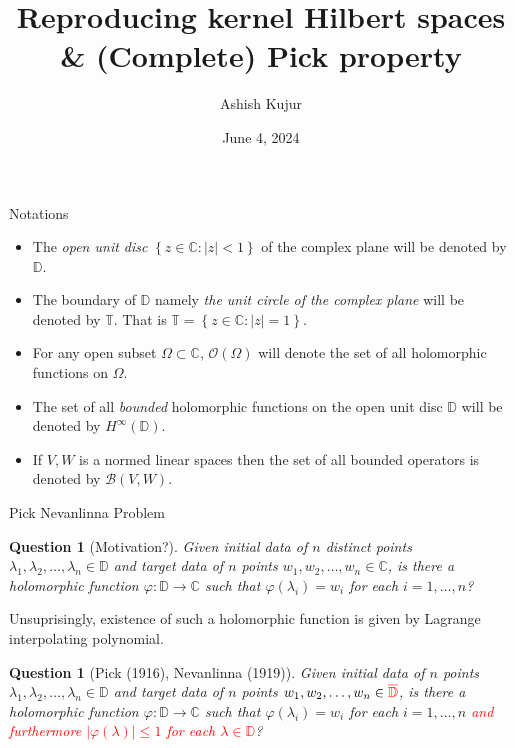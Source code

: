 \documentclass{beamer}
\title{Reproducing kernel Hilbert spaces \&  (Complete) Pick property}
\author{Ashish Kujur}
\institute{Indian Institute of Science Education and Research, Thiruvananthapuram}
\date{June 4, 2024}
\newtheorem{question}[theorem]{Question}
\newcommand{\C}{\mathbb C}
\newcommand{\D}{\mathbb D}
\newcommand{\T}{\mathbb T}
\newcommand{\calB}{{\mathcal B}}
\newcommand{\calO}{{\mathcal O}}
\newcommand{\abs}[1]{\left\lvert #1 \right\rvert}
\begin{document}
 \begin{frame}
   \maketitle
 \end{frame}

 \begin{frame}{Notations}
\begin{itemize}
\item The \textit{open unit disc} $\left\{ z\in \C : \abs{z} < 1 \right\}$ of the complex plane will be denoted by $\D$.
\item The boundary of $\D$ namely \textit{the unit circle of the complex plane} will be denoted by $\T$. That is $\T = \left\{ z \in \C : \abs{z} = 1 \right\}$. 
\item For any open subset $\Omega \subset \C$, $\calO \left( \Omega \right)$ will denote the set of all holomorphic functions on $\Omega$.
\item The set of all \textit{bounded} holomorphic functions on the open unit disc $\D$ will be denoted by $H^{\infty} \left( \D \right)$.
\item If $V,W$ is a normed linear spaces then the set of all bounded operators is denoted by $\calB \left( V, W \right)$.
\end{itemize}
 \end{frame}

\begin{frame}{Pick Nevanlinna Problem}
\begin{question}[Motivation?]
Given \textit{initial data} of $n$ distinct points $\lambda_{1}, \lambda_{2}, \ldots , \lambda_{n} \in \D$ and \textit{target data} of $n$ points $w_{1}, w_{2}, \ldots , w_{n} \in \C$, is there a \textit{holomorphic} function $\varphi : \D \to \C$ such that $\varphi \left( \lambda_{i} \right) = w_{i}$ for each $i=1, \ldots, n$?
\end{question}
\pause
Unsuprisingly, existence of such a holomorphic function is given by Lagrange interpolating polynomial.
\pause
\begin{question}[Pick (1916), Nevanlinna (1919)]
Given \textit{initial data} of $n$ points $\lambda_{1}, \lambda_{2}, \ldots , \lambda_{n} \in \D$ and \textit{target data} of $n$ points $w_{1}, w_{2}, \ldots , w_{n} \in \textcolor{red}{\overline{\D}}$, is there a \textit{holomorphic} function $\varphi : \D \to \C$ such that $\varphi \left( \lambda_{i} \right) = w_{i}$ for each $i=1, \ldots, n$ \textcolor{red}{and furthermore $\abs{\varphi \left( \lambda \right)} \le 1$ for each $\lambda \in \D$}?
\end{question}
\end{frame}
\end{document}
